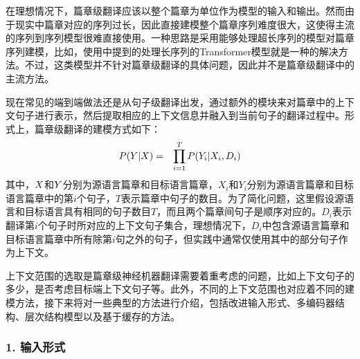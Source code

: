 \parinterval 在理想情况下，篇章级翻译应该以整个篇章为单位作为模型的输入和输出。然而由于现实中篇章对应的序列过长，因此直接建模整个篇章序列难度很大，这使得主流的序列到序列模型很难直接使用。一种思路是采用能够处理超长序列的模型对篇章序列建模，比如，使用{\chapterfifteen}中提到的处理长序列的Transformer模型就是一种的解决方法。不过，这类模型并不针对篇章级翻译的具体问题，因此并不是篇章级翻译中的主流方法。

\parinterval 现在常见的端到端做法还是从句子级翻译出发，通过额外的模块来对篇章中的上下文句子进行表示，然后提取相应的上下文信息并融入到当前句子的翻译过程中。形式上，篇章级翻译的建模方式如下：
\begin{eqnarray}
{P}({Y}|{X})&=&\prod_{i=1}^{T}{{P}(Y_i|X_i,D_i)}
\label{eq:17-3-1}
\end{eqnarray}
其中，${X}$和${Y}$分别为源语言篇章和目标语言篇章，$X_i$和$Y_i$分别为源语言篇章和目标语言篇章中的第$i$个句子，$T$表示篇章中句子的数目。为了简化问题，这里假设源语言和目标语言具有相同的句子数目$T$，而且两个篇章间句子是顺序对应的。$D_i$表示翻译第$i$个句子时所对应的上下文句子集合，理想情况下，$D_i$中包含源语言篇章和目标语言篇章中所有除第$i$句之外的句子，但实践中通常仅使用其中的部分句子作为上下文。

\parinterval 上下文范围的选取是篇章级神经机器翻译需要着重考虑的问题，比如上下文句子的多少，是否考虑目标端上下文句子等。此外，不同的上下文范围也对应着不同的建模方法，接下来将对一些典型的方法进行介绍，包括改进输入形式、多编码器结构、层次结构模型以及基于缓存的方法。


\subsubsection{1. 输入形式}


